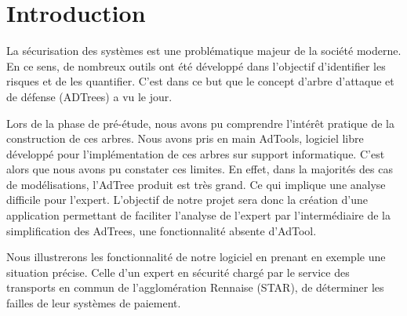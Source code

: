\section{Introduction}
	
	La sécurisation des systèmes est une problématique majeur de la société moderne. En ce sens, de nombreux outils ont été développé dans l'objectif d'identifier les risques et de les quantifier. C'est dans ce but que le concept d'arbre d'attaque et de défense (ADTrees) a vu le jour. 
	
	Lors de la phase de pré-étude, nous avons pu comprendre l’intérêt pratique de la construction de ces arbres. Nous avons pris en main AdTools, logiciel libre développé pour l'implémentation de ces arbres sur support informatique. C'est alors que nous avons pu constater ces limites. En effet, dans la majorités des cas de modélisations, l'AdTree produit est très grand. Ce qui implique une analyse difficile pour l'expert. L'objectif de notre projet sera donc la création d'une application permettant de faciliter l'analyse de l'expert par l’intermédiaire de la simplification des AdTrees, une fonctionnalité absente d'AdTool.

	Nous illustrerons les fonctionnalité de notre logiciel en prenant en exemple une situation précise. Celle d'un expert en sécurité chargé par le service des transports en commun de l'agglomération Rennaise (STAR), de déterminer les failles de leur systèmes de paiement. 













